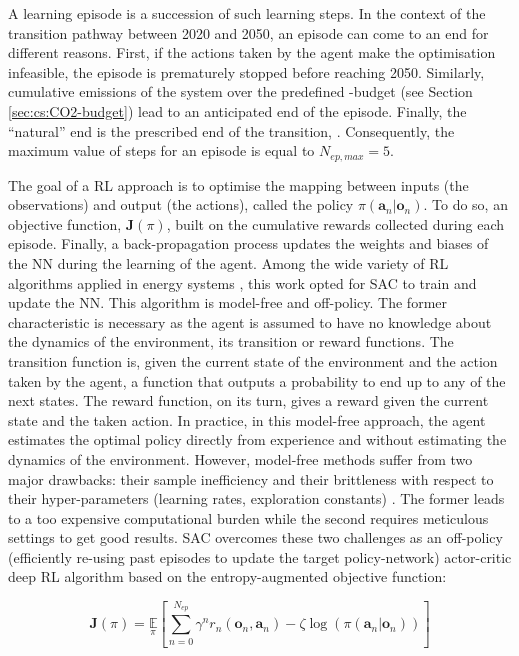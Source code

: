 A learning episode is a succession of such learning steps. In the context of the transition pathway between 2020 and 2050, an episode can come to an end for different reasons. First, if the actions taken by the agent make the optimisation infeasible, the episode is prematurely stopped before reaching 2050. Similarly, cumulative emissions of the system over the predefined -budget (see Section \ref{sec:cs:CO2-budget}) lead to an anticipated end of the episode. Finally, the ``natural'' end is the prescribed end of the transition, . Consequently, the maximum value of steps for an episode is equal to $N_{ep,max}=5$. 

The goal of a \gls{RL} approach is to optimise the mapping between inputs (\ie the observations) and output (\ie the actions), called the policy $\pi\left(\bm{a}_n | \bm{o}_n\right)$. To do so, an objective function, $\bm{J}(\pi)$, built on the cumulative rewards collected during each episode. Finally, a back-propagation process updates the weights and biases of the \gls{NN} during the learning of the agent. Among the wide variety of \gls{RL} algorithms applied in energy systems \cite{perera2021applications}, this work opted for \gls{SAC} \cite{haarnoja2018soft} to train and update the \gls{NN}. This algorithm is model-free and off-policy. The former characteristic is necessary as the agent is assumed to have no knowledge about the dynamics of the environment, \ie its transition or reward functions. The transition function is, given the current state of the environment and the action taken by the agent, a function that outputs a probability to end up to any of the next states. The reward function, on its turn, gives a reward given the current state and the taken action. In practice, in this model-free approach, the agent estimates the optimal policy directly from experience and without estimating the dynamics of the environment. However, model-free methods suffer from two major drawbacks: their sample inefficiency and their brittleness with respect to their hyper-parameters (\eg learning rates, exploration constants) \cite{haarnoja2018soft}. The former leads to a too expensive computational burden while the second requires meticulous settings to get good results. \gls{SAC} overcomes these two challenges as an off-policy (\ie efficiently re-using past episodes to update the target policy-network) actor-critic deep \gls{RL} algorithm based on the entropy-augmented objective function: 

\begin{equation}
    \label{eq:SAC_objective}
    \bm{J}(\pi) = \underset{\pi}{\mathbb{E}}\left[\underset{n=0}{\overset{N_{ep}}{\sum}}\gamma^n r_n\left(\bm{o}_n,\bm{a}_n \right) - \zeta \log \left(\pi\left(\bm{a}_n | \bm{o}_n\right) \right) \right]
\end{equation}

